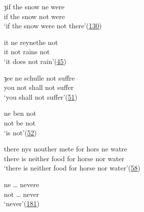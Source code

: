 
\ea \label{ex:01-15} 
 \gll ȝif the snow ne were\\
 if the snow not were\\
 \trans `if the snow were not there'\hfill(\href{https://archive.org/details/voiageandtravai02hallgoog/page/n165/mode/2up?q=%22zif+the+snow+ne+were%22&view=theater}{130})
\z

\ea \label{ex:01-16}
\ea
 \gll it ne reynethe not\\
 it not rains not\\
 \trans `it does not rain'\hfill(\href{https://archive.org/details/voiageandtravai02hallgoog/page/n81/mode/2up?q=%22it+ne+reynethe+not%22&view=theater}{45})
 
\ex
 \gll ȝee ne schulle not suffre\\
 you not shall not suffer\\ %
 \trans `you shall not suffer'\hfill(\href{https://archive.org/details/voiageandtravai02hallgoog/page/n87/mode/2up?q=%22zee+ne+schulle+not%22&view=theater}{51})

 
\ex
 \gll ne ben not\\
 not be not\\
 \trans `is not'\hfill(\href{https://archive.org/details/voiageandtravai02hallgoog/page/n87/mode/2up?q=%22ne+ben+not+so+grete%22&view=theater}{52})

\ex
 \gll there nys nouther mete for hors ne watre\\
 there is neither food for horse nor water\\
 \trans `there is neither food for horse nor water'\hfill(\href{https://archive.org/details/voiageandtravai02hallgoog/page/n93/mode/2up?q=%22there+nys+nouther+mete%22&view=theater}{58})

\ex
 \gll ne {\dots} nevere\\
 not {\dots} never\\
 \trans `never'\hfill(\href{https://archive.org/details/voiageandtravai02hallgoog/page/n217/mode/2up?q=%22ne+meeven+nevere%22&view=theater}{181})

